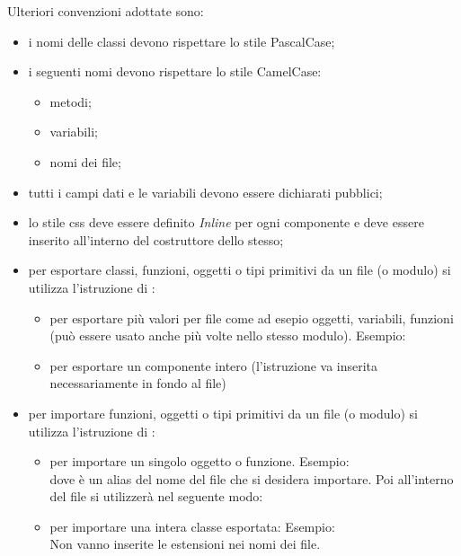             	Ulteriori convenzioni adottate sono:
            	\begin{itemize}
            		\item i nomi delle classi devono rispettare lo stile PascalCase;
            		\item i seguenti nomi devono rispettare lo stile CamelCase:
            			\begin{itemize}
            				\item metodi;
            				\item variabili;
            				\item nomi dei file;
            			\end{itemize}
            		\item tutti i campi dati e le variabili devono essere dichiarati pubblici;
            		\item lo stile css deve essere definito \textit{Inline} per ogni componente e deve essere inserito all'interno del costruttore dello stesso;
            		\item per esportare classi, funzioni, oggetti o tipi primitivi da un file (o modulo) si utilizza l'istruzione  di \jsv{}:
            			\begin{itemize}
            				\item per esportare  più valori per file come ad esepio oggetti, variabili, funzioni (può essere usato anche più volte nello stesso modulo). Esempio: 
            				\item per esportare un componente intero (l'istruzione va inserita necessariamente in fondo al file) 
            			\end{itemize}
            		\item per importare funzioni, oggetti o tipi primitivi da un file (o modulo) si utilizza l'istruzione  di \jsv{}:
            			\begin{itemize}
            				\item per importare un singolo oggetto o funzione. Esempio: \\  dove  è un alias del nome del file che si desidera importare. Poi all'interno del file si utilizzerà nel seguente modo: 
            				\item per importare una intera classe esportata: Esempio: \\  Non vanno inserite le estensioni nei nomi dei file.
            			\end{itemize}
            	\end{itemize}
            	
